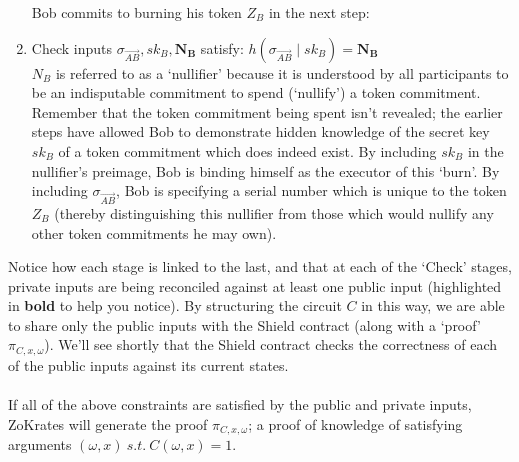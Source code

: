 \begin{enumerate}
  Bob commits to burning his token $Z_B$ in the next step:
  \item Check inputs $\sigma_{\vec{AB}}, sk_B, \bm{N_B}$ satisfy:
    $h(\sigma_{\vec{AB}}\;|\;sk_B) = \bm{N_{B}}$\\
    $N_B$ is referred to as a `nullifier' because it is understood by all participants to be an indisputable commitment to spend (`nullify') a token commitment. Remember that the token commitment being spent isn't revealed; the earlier steps have allowed Bob to demonstrate hidden knowledge of the secret key $sk_B$ of a token commitment which does indeed exist. By including $sk_B$ in the nullifier's preimage, Bob is binding himself as the executor of this `burn'. By including $\sigma_{\vec{AB}}$, Bob is specifying a serial number which is unique to the token $Z_B$ (thereby distinguishing this nullifier from those which would nullify any other token commitments he may own).
\end{enumerate}
Notice how each stage is linked to the last, and that at each of the `Check' stages, private inputs are being reconciled against at least one public input (highlighted in \textbf{bold} to help you notice). By structuring the circuit $C$ in this way, we are able to share only the public inputs with the Shield contract (along with a `proof' $\pi_{C,x,\omega}$). We'll see shortly that the Shield contract checks the correctness of each of the public inputs against its current states.\\
\\

\noindent
If all of the above constraints are satisfied by the public and private inputs, ZoKrates will generate the proof $\pi_{C,x,\omega}$; a proof of knowledge of satisfying arguments $(\omega, x) \ s.t. \ C(\omega, x) = 1$.\\
\\








